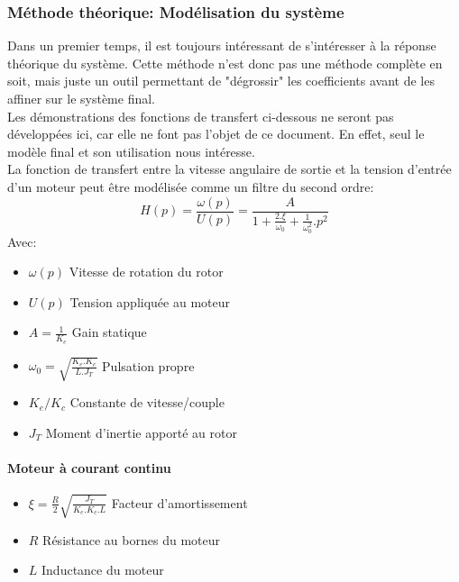             \subsubsection{Méthode théorique: Modélisation du système}
            Dans un premier temps, il est toujours intéressant de s'intéresser à la réponse théorique du système. Cette méthode n'est donc pas une méthode complète en soit, mais juste un outil permettant de "dégrossir" les coefficients avant de les affiner sur le système final.\\
            Les démonstrations des fonctions de transfert ci-dessous ne seront pas développées ici, car elle ne font pas l'objet de ce document. En effet, seul le modèle final et son utilisation nous intéresse.\\
            La fonction de transfert entre la vitesse angulaire de sortie et la tension d'entrée d'un moteur peut être modélisée comme un filtre du second ordre:
            \begin{equation}
                H(p) = \frac{\omega(p)}{U(p)} = \frac{A}{1 + \frac{2.\xi}{\omega_0} + \frac{1}{\omega_0^2}.p^2}
            \end{equation}
            Avec:
            \begin{itemize}
                \item $\omega(p)$ Vitesse de rotation du rotor
                \item $U(p)$ Tension appliquée au moteur
                \item $A = \frac{1}{K_e}$ Gain statique
                \item $\omega_0 = \sqrt{\frac{K_e.K_c}{L.J_T}}$ Pulsation propre
                \item $K_e/K_c$ Constante de vitesse/couple
                \item $J_T$ Moment d'inertie apporté au rotor
            \end{itemize}

            \paragraph{Moteur à courant continu}{
                \begin{itemize}
                    \item $\xi = \frac{R}{2}\sqrt{\frac{J_T}{K_e.K_c.L}}$ Facteur d'amortissement
                    \item $R$ Résistance au bornes du moteur
                    \item $L$ Inductance du moteur
                \end{itemize}
            }



